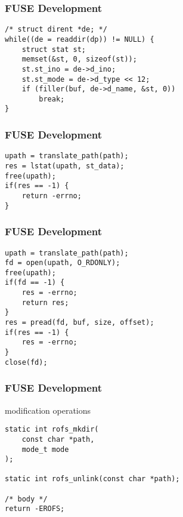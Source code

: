 \documentclass[dvipsnames]{beamer}
\begin{document}
\begin{frame}[fragile]
  \frametitle{FUSE Development}

  \begin{example}
    \begin{lstlisting}
/* struct dirent *de; */
while((de = readdir(dp)) != NULL) {
    struct stat st;
    memset(&st, 0, sizeof(st));
    st.st_ino = de->d_ino;
    st.st_mode = de->d_type << 12;
    if (filler(buf, de->d_name, &st, 0))
        break;
}
    \end{lstlisting}
  \end{example}
\end{frame}

\begin{frame}[fragile]
  \frametitle{FUSE Development}

  \begin{example}
    \begin{lstlisting}
upath = translate_path(path);
res = lstat(upath, st_data);
free(upath);
if(res == -1) {
    return -errno;
}
    \end{lstlisting}
  \end{example}
\end{frame}

\begin{frame}[fragile]
  \frametitle{FUSE Development}

  \begin{example}
    \begin{lstlisting}
upath = translate_path(path);
fd = open(upath, O_RDONLY);
free(upath);
if(fd == -1) {
    res = -errno;
    return res;
}
res = pread(fd, buf, size, offset);
if(res == -1) {
    res = -errno;
}
close(fd);
    \end{lstlisting}
  \end{example}
\end{frame}

\begin{frame}[fragile]
  \frametitle{FUSE Development}

  \begin{block}{modification operations}
    \begin{lstlisting}
static int rofs_mkdir(
    const char *path,
    mode_t mode
);

static int rofs_unlink(const char *path);

/* body */
return -EROFS;
    \end{lstlisting}
  \end{block}
\end{frame}
\end{document}

